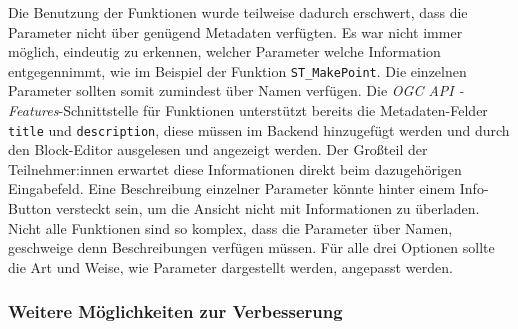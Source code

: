 Die Benutzung der Funktionen wurde teilweise dadurch erschwert, dass die Parameter nicht über genügend Metadaten verfügten. Es war nicht immer möglich, eindeutig zu erkennen, welcher Parameter welche Information entgegennimmt, wie im Beispiel der Funktion \texttt{ST\_MakePoint}. Die einzelnen Parameter sollten somit zumindest über Namen verfügen. Die \textit{OGC API - Features}-Schnittstelle für Funktionen unterstützt bereits die Metadaten-Felder \texttt{title} und \texttt{description}, diese müssen im Backend hinzugefügt werden und durch den Block-Editor ausgelesen und angezeigt werden. Der Großteil der Teilnehmer:innen erwartet diese Informationen direkt beim dazugehörigen Eingabefeld. Eine Beschreibung einzelner Parameter könnte hinter einem Info-Button versteckt sein, um die Ansicht nicht mit Informationen zu überladen. Nicht alle Funktionen sind so komplex, dass die Parameter über Namen, geschweige denn Beschreibungen verfügen müssen. Für alle drei Optionen sollte die Art und Weise, wie Parameter dargestellt werden, angepasst werden.


\subsubsection{Weitere Möglichkeiten zur Verbesserung}

